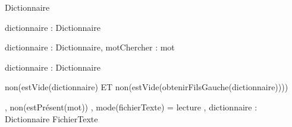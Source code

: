 \begin{algorithme}
		{}%
		{Dictionnaire}
	
		{dictionnaire : Dictionnaire}%
		{\booleen}
	
		{dictionnaire : Dictionnaire, motChercher : mot}%
		{\booleen}

		{dictionnaire : Dictionnaire}%
		{\entier}

		{}
		{non(estVide(dictionnaire) ET non(estVide(obtenirFilsGauche(dictionnaire))))}
	
		{,}
		{non(estPrésent(mot))}
		{, }%
		{mode(fichierTexte) = lecture}
		{, }
		{dictionnaire : Dictionnaire}%
		{FichierTexte}
\end{algorithme}
